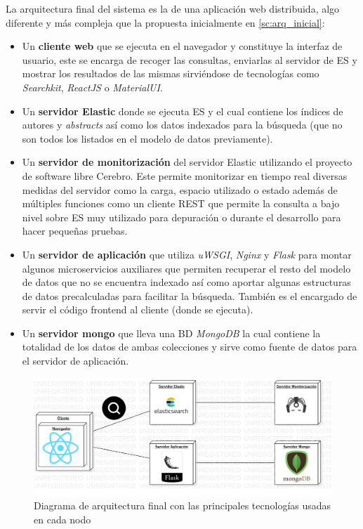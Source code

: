 La arquitectura final del sistema es la de una aplicación web distribuida, algo diferente y más compleja que la propuesta inicialmente en \ref{sc:arq_inicial}:
\begin{itemize}
	\item Un \textbf{cliente web} que se ejecuta en el navegador y constituye la interfaz de usuario, este se encarga de recoger las consultas, enviarlas al servidor de \acrfull{ES} y mostrar los resultados de las mismas sirviéndose de tecnologías como \textit{Searchkit}, \textit{ReactJS} o \textit{MaterialUI}. 
	
	\item Un \textbf{servidor Elastic} donde se ejecuta \acrshort{ES} y el cual contiene los índices de autores y \textit{abstracts} así como los datos indexados para la búsqueda (que no son todos los listados en el modelo de datos previamente).
	
	\item Un \textbf{servidor de monitorización} del servidor Elastic utilizando el proyecto de software libre Cerebro. Este permite monitorizar en tiempo real diversas medidas del servidor como la carga, espacio utilizado o estado además de múltiples funciones como un cliente REST que permite la consulta a bajo nivel sobre \acrshort{ES} muy utilizado para depuración o durante el desarrollo para hacer pequeñas pruebas.
	
	\item Un \textbf{servidor de aplicación} que utiliza \textit{uWSGI}, \textit{Nginx} y \textit{Flask} para montar algunos microservicios auxiliares que permiten recuperar el resto del modelo de datos que no se encuentra indexado así como aportar algunas estructuras de datos precalculadas para facilitar la búsqueda. También es el encargado de servir el código \gls{frontend} al cliente (donde se ejecuta).
	
	\item Un \textbf{servidor mongo} que lleva una \acrshort{BD} \textit{MongoDB} la cual contiene la totalidad de los datos de ambas colecciones y sirve como fuente de datos para el servidor de aplicación.
	
\end{itemize}

\begin{figure}[ht]
	
	\centering
	\includegraphics[width=0.9\linewidth]{imagenes/achitecture}
	\caption{Diagrama de arquitectura final con las principales tecnologías usadas en cada nodo}
	\label{fig:finalArchitecture}
\end{figure}